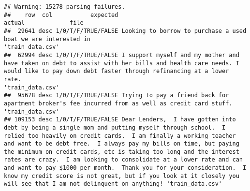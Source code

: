 \documentclass[
]{article}
\begin{document}
\begin{verbatim}
## Warning: 15278 parsing failures.
##    row  col           expected                                                                                                                                                                                                                                                                                                                                                                                                                                                                                                                                                                            actual             file
##  29641 desc 1/0/T/F/TRUE/FALSE Looking to borrow to purchase a used boat we are interested in                                                                                                                                                                                                                                                                                                                                                                                                                                                                                                                    'train_data.csv'
##  62994 desc 1/0/T/F/TRUE/FALSE I support myself and my mother and have taken on debt to assist with her bills and health care needs. I would like to pay down debt faster through refinancing at a lower rate.                                                                                                                                                                                                                                                                                                                                                                                                   'train_data.csv'
##  95678 desc 1/0/T/F/TRUE/FALSE Trying to pay a friend back for apartment broker's fee incurred from as well as credit card stuff.                                                                                                                                                                                                                                                                                                                                                                                                                                                                                'train_data.csv'
## 109153 desc 1/0/T/F/TRUE/FALSE Dear Lenders,  I have gotten into debt by being a single mom and putting myself through school.  I relied too heavily on credit cards.  I am finally a working teacher and want to be debt free.  I always pay my bills on time, but paying the minimum on credit cards, etc is taking too long and the interest rates are crazy.  I am looking to consolidate at a lower rate and can and want to pay $1000 per month.  Thank you for your consideration.  I know my credit score is not great, but if you look at it closely you will see that I am not delinquent on anything! 'train_data.csv'

\end{verbatim}
\end{document}
